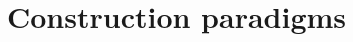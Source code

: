 \chapter[Construction paradigms]{Construction paradigms{\normalsize{}}}
\label{chap:paradigms}







